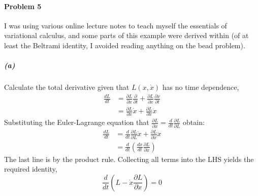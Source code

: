 \documentclass[12pt]{scrartcl}
\begin{document}
\paragraph{Problem 5}
I was using various online lecture notes to teach myself the essentials of variational calculus, and some parts of this example were derived within (of at least the Beltrami identity, I avoided reading anything on the bead problem). 
\subparagraph{(a)} Calculate the total derivative given that $L(x, \dot{x})$ has no time dependence,
\begin{align*}
	\frac{d L}{d t} &= \frac{\partial L}{\partial x}\frac{ \partial}{\partial t} + 
	\frac{\partial L}{\partial\dot{x}}\frac{\partial \dot{x}}{\partial t}\\
	&= \frac{\partial L}{\partial x}\dot{x} + \frac{\partial L}{\partial \dot{x}} \ddot{x}
\end{align*}
Substituting the Euler-Lagrange equation that $\frac{\partial L}{\partial x} = \frac{d}{d t}\frac{\partial L}{\partial L}$ obtain:
\begin{align*}
	\frac{d L}{d t} &= \frac{d}{d t}\frac{\partial L}{\partial L}\dot{x} + \frac{\partial L}{\partial \dot{x}} \ddot{x}\\
	&= \frac{d}{d t}\left(\frac{d x}{d t}\frac{\partial L}{\partial \dot{x}}\right)
\end{align*}
The last line is by the product rule. Collecting all terms into the LHS yields the required identity,
\[\frac{d}{d t}\left(L - \dot{x}\frac{\partial L}{\partial \dot{x}}\right)=0\]
\end{document}

